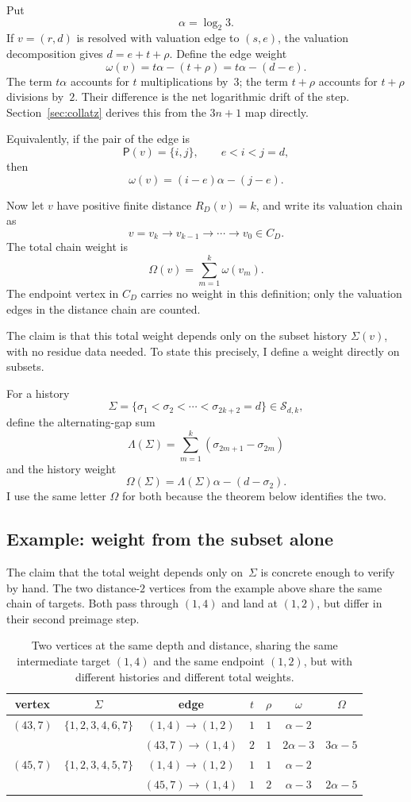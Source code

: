 \documentclass[11pt]{amsart}
\theoremstyle{definition}
\theoremstyle{remark}
\newcommand{\Pair}{\mathsf P}
\newcommand{\Sfam}{\mathcal S}
\begin{document}
Put
\[
\alpha=\log_2 3.
\]
If $v=(r,d)$ is resolved with valuation edge to $(s,e)$, the valuation decomposition gives $d=e+t+\rho$.  Define the edge weight
\[
\omega(v)=t\alpha-(t+\rho)=t\alpha-(d-e).
\]
The term $t\alpha$ accounts for $t$ multiplications by~$3$; the term $t+\rho$ accounts for $t+\rho$ divisions by~$2$.  Their difference is the net logarithmic drift of the step.  Section~\ref{sec:collatz} derives this from the $3n+1$ map directly.

Equivalently, if the pair of the edge is
\[
\Pair(v)=\{i,j\},\qquad e<i<j=d,
\]
then
\[
\omega(v)=(i-e)\alpha-(j-e).
\]

Now let $v$ have positive finite distance $R_D(v)=k$, and write its valuation chain as
\[
v=v_k\to v_{k-1}\to\cdots\to v_0\in C_D.
\]
The total chain weight is
\[
\Omega(v)=\sum_{m=1}^k \omega(v_m).
\]
The endpoint vertex in $C_D$ carries no weight in this definition; only the valuation edges in the distance chain are counted.

The claim is that this total weight depends only on the subset history $\Sigma(v)$, with no residue data needed.  To state this precisely, I define a weight directly on subsets.

For a history
\[
\Sigma=\{\sigma_1<\sigma_2<\cdots<\sigma_{2k+2}=d\}\in\Sfam_{d,k},
\]
define the alternating-gap sum
\[
\Lambda(\Sigma)=\sum_{m=1}^k(\sigma_{2m+1}-\sigma_{2m})
\]
and the history weight
\[
\Omega(\Sigma)=\Lambda(\Sigma)\alpha-(d-\sigma_2).
\]
I use the same letter $\Omega$ for both because the theorem below identifies the two.

\subsection{Example: weight from the subset alone}\label{subsec:weight-ex}

The claim that the total weight depends only on~$\Sigma$ is concrete enough to verify by hand.  The two distance-$2$ vertices from the example above share the same chain of targets. Both pass through $(1,4)$ and land at $(1,2)$, but differ in their second preimage step.

\begin{table}[h]
\centering
\begin{tabular}{ccccccc}
\hline
vertex & $\Sigma$ & edge & $t$ & $\rho$ & $\omega$ & $\Omega$\\
\hline
$(43,7)$ & $\{1,2,3,4,6,7\}$
  & $(1,4)\to(1,2)$ & $1$ & $1$ & $\alpha-2$ & \\
  & & $(43,7)\to(1,4)$ & $2$ & $1$ & $2\alpha-3$ & $3\alpha-5$\\[4pt]
$(45,7)$ & $\{1,2,3,4,5,7\}$
  & $(1,4)\to(1,2)$ & $1$ & $1$ & $\alpha-2$ & \\
  & & $(45,7)\to(1,4)$ & $1$ & $2$ & $\alpha-3$ & $2\alpha-5$\\
\hline
\end{tabular}
\smallskip
\caption{Two vertices at the same depth and distance, sharing the same intermediate target $(1,4)$ and the same endpoint $(1,2)$, but with different histories and different total weights.}
\label{tab:weight-ex}
\end{table}
\end{document}
